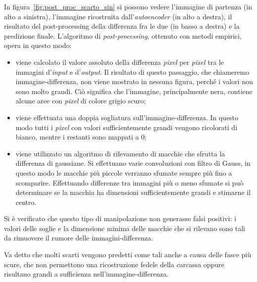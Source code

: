 In figura~\ref{fig:post_proc_scarto_sin} si possono vedere l'immagine di partenza (in alto a sinistra), l'immagine ricostruita dall'\textit{autoencoder} (in alto a destra), il risultato del post-processing della differenza fra le due (in basso a destra) e la predizione finale.
L'algoritmo di \textit{post-processing}, ottenuto con metodi empirici, opera in questo modo:
\begin{itemize}
  \item viene calcolato il valore assoluto della differenza \textit{pixel} per \textit{pixel} tra le immagini d'\textit{input} e d'\textit{output}.
    Il risultato di questo passaggio, che chiameremo immagine-differenza, non viene mostrato in nessuna figura, perché i valori non sono molto grandi.
    Ciò significa che l'immagine, principalmente nera, contiene alcune aree con \textit{pixel} di colore grigio scuro;

  \item viene effettuata una doppia sogliatura sull'immagine-differenza.
    In questo modo tutti i \textit{pixel} con valori sufficientemente grandi vengono ricolorati di bianco, mentre i restanti sono mappati a $0$;


  \item viene utilizzato un algoritmo di rilevamento di macchie che sfrutta la differenza di gaussiane.
    Si effettuano varie convoluzioni con filtro di Gauss, in questo modo le macchie più piccole verranno sfumate sempre più fino a scomparire.
    Effettuando differenze tra immagini più o meno sfumate si può determinare se la macchia ha dimensioni sufficientemente grandi e stimarne il centro.

\end{itemize}

Si è verificato che questo tipo di manipolazione non generasse falsi positivi: i valori delle soglie e la dimensione minima delle macchie che si rilevano sono tali da rimuovere il rumore delle immagini-differenza.

Va detto che molti scarti vengono predetti come tali anche a causa delle fasce più scure, che non permettono una ricostruzione fedele  della carcassa oppure risultano grandi a sufficienza nell'immagine-differenza.

